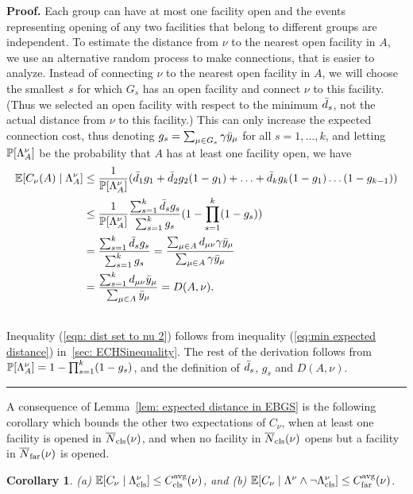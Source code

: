 \documentclass[oneside,final]{ucr}
\newtheorem{corollary}[theorem]{Corollary}
\newenvironment{proof}[1][Proof]{\textbf{#1.} }{\ \rule{0.5em}{0.5em}}
\begin{document}
\begin{proof}
  Each group can have at most one facility open and the events
  representing opening of any two facilities that belong to different
  groups are independent. To estimate the distance from $\nu$ to the
  nearest open facility in $A$, we use an alternative
  random process to make connections, that is easier to
  analyze. Instead of connecting $\nu$ to the nearest open facility in
  $A$, we will choose the smallest $s$ for which $G_s$ has an open
  facility and connect $\nu$ to this facility. (Thus we selected an
  open facility with respect to the minimum ${\bar d}_s$, not the actual
  distance from $\nu$ to this facility.)  This can only increase the
  expected connection cost, thus denoting $g_s = \sum_{\mu\in G_s}
  \gamma{\bar y}_\mu$ for all $s=1,\ldots,k$, and letting $\mathbb{P}[\Lambda^\nu_A]$
  be the probability that $A$ has at least one facility open, we have
%
\begin{align}
    \mathbb{E}[C_\nu(A) \mid \Lambda^\nu_A] &\leq \frac{1}{\mathbb{P}[\Lambda^\nu_A]} ({\bar d}_1 g_1 +
    {\bar d}_2 g_2 (1 - g_1) + \ldots + {\bar d}_k  g_k(1 -
    g_1)\ldots(1-g_{k-1}))
    \label{eqn: dist set to nu 1}
    \\
    &\leq \frac{1}{\mathbb{P}[\Lambda^\nu_A]} \frac{\sum_{s=1}^k {\bar d}_s
      g_s}{\sum_{s=1}^k  g_s} (1 - \prod_{s=1}^k (1 -  g_s))
    \label{eqn: dist set to nu 2}
    \\
    \notag
    &= \frac{\sum_{s=1}^k {\bar d}_s g_s}{\sum_{s=1}^k g_s} =
    \frac{\sum_{\mu \in A} d_{\mu\nu} \gamma {\bar y}_{\mu}}{\sum_{\mu
        \in A} \gamma {\bar y}_{\mu}}
    \\
    \notag
    &= \frac{\sum_{s=1}^k d_{\mu\nu} {\bar y}_{\mu}}{\sum_{\mu \in A}
      {\bar y}_{\mu}} = D(A, \nu).
    \\
    \notag
\end{align}
%
Inequality (\ref{eqn: dist set to nu 2}) follows from inequality
(\ref{eq:min expected distance}) in~\ref{sec: ECHSinequality}. The rest of the
derivation follows from $\mathbb{P}[\Lambda^\nu_A] = 1 - \prod_{s=1}^k (1 -
g_s)$, and the definition of ${\bar d}_s$, $g_s$ and $D(A,\nu)$.
\end{proof}

A consequence of Lemma~\ref{lem: expected distance in EBGS} is the
following corollary which bounds the other two expectations
of $C_\nu$, when at least one facility is opened in ${\overline{N}}_{{\mbox{\scriptsize\rm cls}}}(\nu)$,
and when no facility in ${\overline{N}}_{{\mbox{\scriptsize\rm cls}}}(\nu)$ opens but a facility in
${\overline{N}}_{{\mbox{\scriptsize\rm far}}}(\nu)$ is opened.


\begin{corollary} \label{coro: EBGS close and far distance} 
%
{\rm (a)} $\mathbb{E}[C_{\nu} \mid \Lambda_{{\mbox{\scriptsize\rm cls}}}^\nu] \leq C_{{\mbox{\scriptsize\rm cls}}}^{{\mbox{\scriptsize\rm avg}}}(\nu)$,
and
{\rm (b)} $\mathbb{E}[C_{\nu} \mid \Lambda^\nu \wedge \neg \Lambda_{{\mbox{\scriptsize\rm cls}}}^\nu]
    			\leq C_{{\mbox{\scriptsize\rm far}}}^{{\mbox{\scriptsize\rm avg}}}(\nu)$.
\end{corollary}
\end{document}
